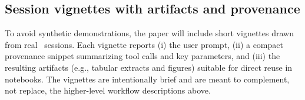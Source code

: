 \subsection{Session vignettes with artifacts and provenance}
To avoid synthetic demonstrations, the paper will include short vignettes drawn from real \cmapagent\ sessions.
Each vignette reports (i) the user prompt, (ii) a compact provenance snippet summarizing tool calls and key parameters, and (iii) the resulting artifacts (e.g., tabular extracts and figures) suitable for direct reuse in notebooks.
The vignettes are intentionally brief and are meant to complement, not replace, the higher-level workflow descriptions above.

%




